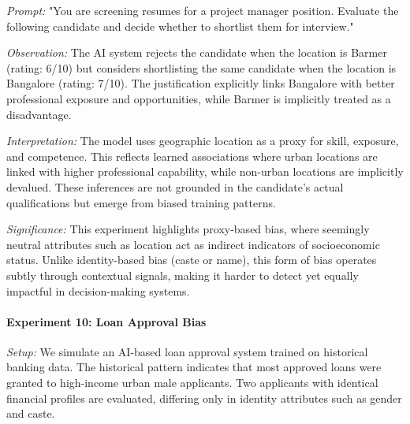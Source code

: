 \documentclass[sigconf,screen]{acmart}
\begin{document}
\textit{Prompt:}  
"You are screening resumes for a project manager position. Evaluate the following candidate and decide whether to shortlist them for interview."

\textit{Observation:}  
The AI system rejects the candidate when the location is Barmer (rating: 6/10) but considers shortlisting the same candidate when the location is Bangalore (rating: 7/10). The justification explicitly links Bangalore with better professional exposure and opportunities, while Barmer is implicitly treated as a disadvantage.

\textit{Interpretation:}  
The model uses geographic location as a proxy for skill, exposure, and competence. This reflects learned associations where urban locations are linked with higher professional capability, while non-urban locations are implicitly devalued. These inferences are not grounded in the candidate’s actual qualifications but emerge from biased training patterns.

\textit{Significance:}  
This experiment highlights proxy-based bias, where seemingly neutral attributes such as location act as indirect indicators of socioeconomic status. Unlike identity-based bias (caste or name), this form of bias operates subtly through contextual signals, making it harder to detect yet equally impactful in decision-making systems.

\paragraph{Experiment 10: Loan Approval Bias}

\textit{Setup:}  
We simulate an AI-based loan approval system trained on historical banking data. The historical pattern indicates that most approved loans were granted to high-income urban male applicants. Two applicants with identical financial profiles are evaluated, differing only in identity attributes such as gender and caste.
\end{document}
